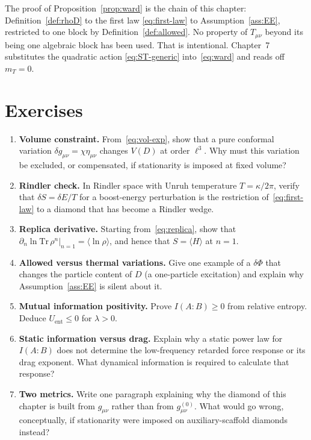 The proof of Proposition~\ref{prop:ward} is the chain of this
chapter: Definition~\ref{def:rhoD} to the first law
\eqref{eq:first-law} to Assumption~\ref{ass:EE}, restricted to one
block by Definition~\ref{def:allowed}. No property of \(T_{\mu\nu}\)
beyond its being one algebraic block has been used. That is
intentional. Chapter~7 substitutes the quadratic action
\eqref{eq:ST-generic} into~\eqref{eq:ward} and reads off \(m_T=0\).

\section{Exercises}
\label{sec:ch6-exercises}

\begin{enumerate}
  \item \textbf{Volume constraint.}
    From~\eqref{eq:vol-exp}, show that a pure conformal variation
    \(\delta g_{\mu\nu}=\chi\eta_{\mu\nu}\) changes \(V(D)\) at
    order \(\ell^3\). Why must this variation be excluded, or
    compensated, if stationarity is imposed at fixed volume?
  \item \textbf{Rindler check.}
    In Rindler space with Unruh temperature \(T=\kappa/2\pi\),
    verify that \(\delta S=\delta E/T\) for a boost-energy
    perturbation is the restriction of~\eqref{eq:first-law} to a
    diamond that has become a Rindler wedge.
  \item \textbf{Replica derivative.}
    Starting from~\eqref{eq:replica}, show that
    \(\partial_n\ln\mathrm{Tr}\,\rho^n|_{n=1}=\langle\ln\rho\rangle\),
    and hence that \(S=\langle H\rangle\) at \(n=1\).
  \item \textbf{Allowed versus thermal variations.}
    Give one example of a \(\delta\Phi\) that changes the particle
    content of \(D\) (a one-particle excitation) and explain why
    Assumption~\ref{ass:EE} is silent about it.
  \item \textbf{Mutual information positivity.}
    Prove \(I(A:B)\ge 0\) from relative entropy. Deduce
    \(U_{\mathrm{ent}}\le 0\) for \(\lambda>0\).
  \item \textbf{Static information versus drag.}
    Explain why a static power law for \(I(A:B)\) does not determine
    the low-frequency retarded force response or its drag exponent.
    What dynamical information is required to calculate that
    response?
  \item \textbf{Two metrics.}
    Write one paragraph explaining why the diamond of this chapter
    is built from \(g_{\mu\nu}\) rather than from \(g^{(0)}_{\mu\nu}\).
    What would go wrong, conceptually, if stationarity were imposed
    on auxiliary-scaffold diamonds instead?
\end{enumerate}

